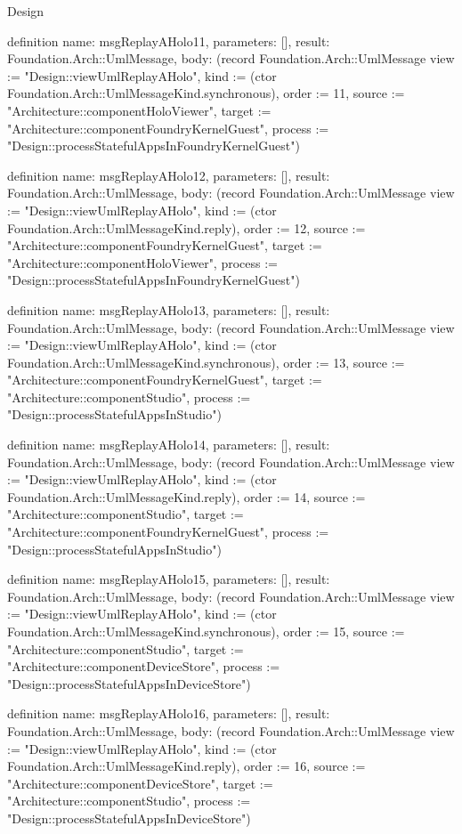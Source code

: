 \begin{lexlean}{Design}
\begin{semanticmodule}
definition{
  name: msgReplayAHolo11,
  parameters: [],
  result: Foundation.Arch::UmlMessage,
  body: (record Foundation.Arch::UmlMessage {view := "Design::viewUmlReplayAHolo", kind := (ctor Foundation.Arch::UmlMessageKind.synchronous), order := 11, source := "Architecture::componentHoloViewer", target := "Architecture::componentFoundryKernelGuest", process := "Design::processStatefulAppsInFoundryKernelGuest"})
}

definition{
  name: msgReplayAHolo12,
  parameters: [],
  result: Foundation.Arch::UmlMessage,
  body: (record Foundation.Arch::UmlMessage {view := "Design::viewUmlReplayAHolo", kind := (ctor Foundation.Arch::UmlMessageKind.reply), order := 12, source := "Architecture::componentFoundryKernelGuest", target := "Architecture::componentHoloViewer", process := "Design::processStatefulAppsInFoundryKernelGuest"})
}

definition{
  name: msgReplayAHolo13,
  parameters: [],
  result: Foundation.Arch::UmlMessage,
  body: (record Foundation.Arch::UmlMessage {view := "Design::viewUmlReplayAHolo", kind := (ctor Foundation.Arch::UmlMessageKind.synchronous), order := 13, source := "Architecture::componentFoundryKernelGuest", target := "Architecture::componentStudio", process := "Design::processStatefulAppsInStudio"})
}

definition{
  name: msgReplayAHolo14,
  parameters: [],
  result: Foundation.Arch::UmlMessage,
  body: (record Foundation.Arch::UmlMessage {view := "Design::viewUmlReplayAHolo", kind := (ctor Foundation.Arch::UmlMessageKind.reply), order := 14, source := "Architecture::componentStudio", target := "Architecture::componentFoundryKernelGuest", process := "Design::processStatefulAppsInStudio"})
}

definition{
  name: msgReplayAHolo15,
  parameters: [],
  result: Foundation.Arch::UmlMessage,
  body: (record Foundation.Arch::UmlMessage {view := "Design::viewUmlReplayAHolo", kind := (ctor Foundation.Arch::UmlMessageKind.synchronous), order := 15, source := "Architecture::componentStudio", target := "Architecture::componentDeviceStore", process := "Design::processStatefulAppsInDeviceStore"})
}

definition{
  name: msgReplayAHolo16,
  parameters: [],
  result: Foundation.Arch::UmlMessage,
  body: (record Foundation.Arch::UmlMessage {view := "Design::viewUmlReplayAHolo", kind := (ctor Foundation.Arch::UmlMessageKind.reply), order := 16, source := "Architecture::componentDeviceStore", target := "Architecture::componentStudio", process := "Design::processStatefulAppsInDeviceStore"})
}


\end{semanticmodule}
\end{lexlean}
